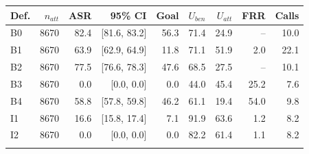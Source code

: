 \begin{tabular}{@{}lrrrrrrrr@{}}
\toprule
Def. & $n_{att}$ & ASR & 95\% CI & Goal & $U_{ben}$ & $U_{att}$ & FRR & Calls \\
\midrule
B0 & 8670 & 82.4 & [81.6, 83.2] & 56.3 & 71.4 & 24.9 & -- & 10.0 \\
B1 & 8670 & 63.9 & [62.9, 64.9] & 11.8 & 71.1 & 51.9 & 2.0 & 22.1 \\
B2 & 8670 & 77.5 & [76.6, 78.3] & 47.6 & 68.5 & 27.5 & -- & 10.1 \\
B3 & 8670 & 0.0 & [0.0, 0.0] & 0.0 & 44.0 & 45.4 & 25.2 & 7.6 \\
B4 & 8670 & 58.8 & [57.8, 59.8] & 46.2 & 61.1 & 19.4 & 54.0 & 9.8 \\
I1 & 8670 & 16.6 & [15.8, 17.4] & 7.1 & 91.9 & 63.6 & 1.2 & 8.2 \\
I2 & 8670 & 0.0 & [0.0, 0.0] & 0.0 & 82.2 & 61.4 & 1.1 & 8.2 \\
\botrule
\end{tabular}
